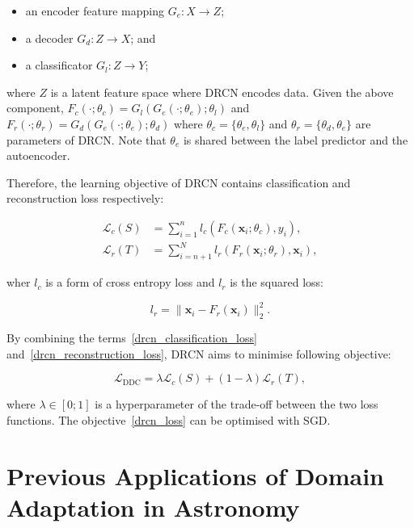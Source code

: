 \begin{itemize}
	\item an encoder feature mapping \(G_e: X \to Z\);
	\item a decoder \(G_d: Z \to X\); and
	\item a classificator \(G_l: Z \to Y\);
\end{itemize}

where \(Z\) is a latent feature space where DRCN encodes data.
Given the above component,
\(F_c(\cdot; \theta_c) = G_l(G_e(\cdot; \theta_e); \theta_l)\)
and \(F_r(\cdot; \theta_r) = G_d(G_e(\cdot; \theta_e); \theta_d)\)
where \(\theta_c = \{\theta_e, \theta_l\}\)
and \(\theta_r = \{\theta_d, \theta_e\}\) are parameters of DRCN.
Note that \(\theta_e\) is shared between the label predictor and the autoencoder.

Therefore, the learning objective of DRCN contains classification and reconstruction loss respectively:

\begin{align}
	\mathcal{L}_c(S) &= \sum_{i = 1}^{n}
	l_c(F_c(\mathbf{x}_i; \theta_c), y_i),
	\label{drcn_classification_loss} \\
	\mathcal{L}_r(T) &= \sum_{i = n + 1}^{N}
	l_r(F_r(\mathbf{x}_i; \theta_r), \mathbf{x}_i),
	\label{drcn_reconstruction_loss}
\end{align}

wher \(l_c\) is a form of cross entropy loss
and \(l_r\) is the squared loss:

\begin{equation}
	l_r = \|\mathbf{x}_i - F_r(\mathbf{x}_i)\|_2^2.
\end{equation}

By combining the terms~\ref{drcn_classification_loss} and~\ref{drcn_reconstruction_loss},
DRCN aims to minimise following objective:

\begin{equation}
	\mathcal{L}_{\mathrm{DDC}}
	= \lambda \mathcal{L}_c(S) + (1 - \lambda) \mathcal{L}_r(T),
	\label{drcn_loss}
\end{equation}

where \(\lambda \in [0; 1]\) is a hyperparameter of the trade-off between the two loss functions.
The objective~\ref{drcn_loss} can be optimised with SGD.

\section{Previous Applications of Domain Adaptation in Astronomy}

